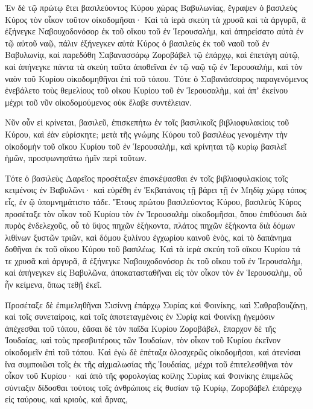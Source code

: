 {\par }{\PP {}Ἐν δὲ τῷ πρώτῳ ἔτει βασιλεύοντος Κύρου χώρας Βαβυλωνίας, ἔγραψεν ὁ βασιλεὺς Κύρος τὸν οἶκον τοῦτον οἰκοδομῆσαι·
Καὶ τὰ ἱερὰ σκεύη τὰ χρυσᾶ καὶ τὰ ἀργυρᾶ, ἃ ἐξήνεγκε Ναβουχοδονόσορ ἐκ τοῦ οἴκου τοῦ ἐν Ἱερουσαλὴμ, καὶ ἀπηρείσατο αὐτὰ ἐν τῷ αὐτοῦ ναῷ, πάλιν ἐξήνεγκεν αὐτὰ Κύρος ὁ βασιλεὺς ἐκ τοῦ ναοῦ τοῦ ἐν Βαβυλωνίᾳ, καὶ παρεδόθη Σαβανασσάρῳ Ζοροβάβελ τῷ ἐπάρχῳ,
καὶ ἐπετάγη αὐτῷ, καὶ ἀπήνεγκε πάντα τὰ σκεύη ταῦτα ἀποθεῖναι ἐν τῷ ναῷ τῷ ἐν Ἱερουσαλὴμ, καὶ τὸν ναὸν τοῦ Κυρίου οἰκοδομηθῆναι ἐπὶ τοῦ τόπου.
Τότε ὁ Σαβανάσσαρος παραγενόμενος ἐνεβάλετο τοὺς θεμελίους τοῦ οἴκου Κυρίου τοῦ ἐν Ἱερουσαλὴμ, καὶ ἀπʼ ἐκείνου μέχρι τοῦ νῦν οἰκοδομούμενος οὐκ ἔλαβε συντέλειαν.
\par }{\PP {}Νῦν οὖν εἰ κρίνεται, βασιλεῦ, ἐπισκεπήτω ἐν τοῖς βασιλικοῖς βιβλιοφυλακίοις τοῦ Κύρου,
καὶ ἐὰν εὑρίσκητε; μετὰ τῆς γνώμης Κύρου τοῦ βασιλέως γενομένην τὴν οἰκοδομὴν τοῦ οἴκου Κυρίου τοῦ ἐν Ἱερουσαλὴμ, καὶ κρίνηται τῷ κυρίῳ βασιλεῖ ἡμῶν, προσφωνησάτω ἡμῖν περὶ τοῦτων.
\par }{\PP {}Τότε ὁ βασιλεὺς Δαρεῖος προσέταξεν ἐπισκέψασθαι ἐν τοῖς βιβλιοφυλακίοις τοῖς κειμένοις ἐν Βαβυλῶνι· καὶ εὑρέθη ἐν Ἐκβατάνοις τῇ βάρει τῇ ἐν Μηδίᾳ χώρᾳ τόπος εἷς, ἐν ῷ ὑπομνημάτιστο τάδε.
Ἔτους πρώτου βασιλεύοντος Κύρου, βασιλεὺς Κύρος προσέταξε τὸν οἶκον τοῦ Κυρίου τὸν ἐν Ἱερουσαλὴμ οἰκοδομῆσαι, ὅπου ἐπιθύουσι διὰ πυρὸς ἐνδελεχοῦς, οὗ τὸ ὕψος πηχῶν ἑξήκοντα,
πλάτος πηχῶν ἑξήκοντα διὰ δόμων λιθίνων ξυστῶν τριῶν, καὶ δόμου ξυλίνου ἐγχωρίου καινοῦ ἑνὸς, καὶ τὸ δαπάνημα δοθῆναι ἐκ τοῦ οἴκου Κύρου τοῦ βασιλέως.
Καὶ τὰ ἱερὰ σκεύη τοῦ οἴκου Κυρίου τά τε χρυσᾶ καὶ ἀργυρᾶ, ἃ ἐξήνεγκε Ναβουχοδονόσορ ἐκ τοῦ οἴκου τοῦ ἐν Ἱερουσαλὴμ, καὶ ἀπήνεγκεν εἰς Βαβυλῶνα, ἀποκατασταθῆναι εἰς τὸν οἶκον τὸν ἐν Ἱερουσαλὴμ, οὗ ἦν κείμενα, ὅπως τεθῇ ἐκεῖ.
\par }{\PP {}Προσέταξε δὲ ἐπιμεληθῆναι Σισίννῃ ἐπάρχῳ Συρίας καὶ Φοινίκης, καὶ Σαθραβουζάνῃ, καὶ τοῖς συνεταίροις, καὶ τοῖς ἀποτεταγμένοις ἐν Συρίᾳ καὶ Φοινίκῃ ἡγεμόσιν ἀπέχεσθαι τοῦ τόπου, ἐᾶσαι δὲ τὸν παῖδα Κυρίου Ζοροβάβελ, ἔπαρχον δὲ τῆς Ἰουδαίας, καὶ τοὺς πρεσβυτέρους τῶν Ἰουδαίων, τὸν οἶκον τοῦ Κυρίου ἐκεῖνον οἰκοδομεῖν ἐπὶ τοῦ τόπου.
Καὶ ἐγὼ δὲ ἐπέταξα ὁλοσχερῶς οἰκοδομῆσαι, καὶ ἀτενίσαι ἵνα συμποιῶσι τοῖς ἐκ τῆς αἰχμαλωσίας τῆς Ἰουδαίας, μέχρι τοῦ ἐπιτελεσθῆναι τὸν οἶκον τοῦ Κυρίου·
καὶ ἀπὸ τῆς φορολογίας κοίλης Συρίας καὶ Φοινίκης ἐπιμελῶς σύνταξιν δίδοσθαι τούτοις τοῖς ἀνθρώποις εἰς θυσίαν τῷ Κυρίῳ, Ζοροβάβελ ἐπάρεχῳ εἰς ταύρους, καὶ κριοὺς, καὶ ἄρνας,
}
